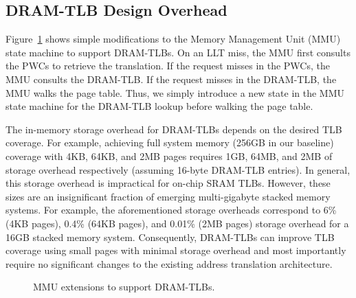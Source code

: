\subsection{DRAM-TLB Design Overhead}

\noindent Figure~\ref{fig:mmu_state} shows simple modifications to the
Memory Management Unit (MMU) state machine to support DRAM-TLBs. On an
LLT miss, the MMU first consults the PWCs to retrieve the translation.
If the request misses in the PWCs, the MMU consults the DRAM-TLB. If
the request misses in the DRAM-TLB, the MMU walks the page table.
Thus, we simply introduce a new state in the MMU state machine for the
DRAM-TLB lookup before walking the page table.

The in-memory storage overhead for DRAM-TLBs depends on the desired
TLB coverage. For example, achieving full system memory (256GB in our
baseline) coverage with 4KB, 64KB, and 2MB pages requires 1GB, 64MB,
and 2MB of storage overhead respectively (assuming 16-byte DRAM-TLB
entries). In general, this storage overhead is impractical for on-chip
SRAM TLBs. However, these sizes are an insignificant fraction of
emerging multi-gigabyte stacked memory systems. For example, the
aforementioned storage overheads correspond to 6\% (4KB pages), 0.4\%
(64KB pages), and 0.01\% (2MB pages) storage overhead for a 16GB
stacked memory system. Consequently, DRAM-TLBs can improve TLB
coverage using small pages with minimal storage overhead and most
importantly require no significant changes to the existing address
translation architecture.

\begin{figure}[tp] 
  \vspace{-0. in} \centering
  \centerline{}

  \caption{\small MMU extensions to support DRAM-TLBs.
    \normalsize}
  \label{fig:mmu_state} 
  \vspace{-0 in}
\end{figure}



% 



